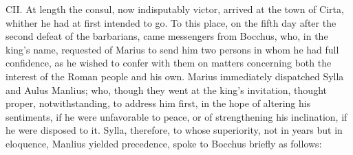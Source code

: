 CII. At length the consul, now indisputably victor, arrived at the
town of Cirta, whither he had at first intended to go. To this place,
on the fifth day after the second defeat of the barbarians, came
messengers from Bocchus, who, in the king's name, requested of Marius
to send him two persons in whom he had full confidence, as he wished
to confer with them on matters concerning both the interest of the
Roman people and his own. Marius immediately dispatched Sylla and
Aulus Manlius; who, though they went at the king's invitation, thought
proper, notwithstanding, to address him first, in the hope of altering
his sentiments, if he were unfavorable to peace, or of strengthening
his inclination, if he were disposed to it. Sylla, therefore, to whose
superiority, not in years but in eloquence, Manlius yielded
precedence, spoke to Bocchus briefly as follows:

